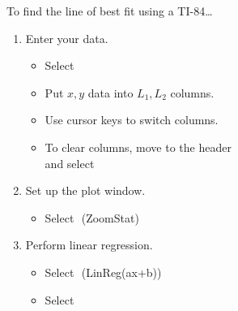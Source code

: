 \begin{minipage}[t]{0.5\textwidth}
\begin{myConcept}{To find the line of best fit using a {\scshape TI-84}\dots}
\begin{enumerate}
\begin{itemize}
\begin{itemize}
                            \item $x$ and $y$ are in $L_1$ and $L_2$ 
                        \end{itemize}
                \end{itemize}
            \item Enter your data.
                \begin{itemize}
                    \item Select 
                    \item Put $x, y$ data into $L_1, L_2$ columns.
                    \item Use cursor keys to switch columns.
                    \item To clear columns, move to the header\\ and select 
                \end{itemize}
            \item Set up the plot window.
                \begin{itemize}
                    \item Select 
                        \,\,{\footnotesize\ttfamily (ZoomStat)}
                \end{itemize}
            \item Perform linear regression.
                \begin{itemize}
                    \item Select 
                        \,\,{(\small\ttfamily LinReg(ax+b))}
                    \item Select 
                \end{itemize}
        \end{enumerate}
    \end{myConcept}
    \end{minipage}
    
    